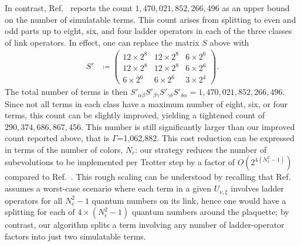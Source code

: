 \documentclass[aps,prd,twocolumn,showpacs,groupedaddress,superscriptaddress,nofootinbib,floatfix,preprintnumbers,longbibliography]{revtex4-1}
\begin{document}
In contrast, Ref.~\cite{Kan:2021xfc} reports the count $1,470,021,852,266,496$ as an upper bound on the number of simulatable terms. This count arises from splitting to even and odd parts up to eight, six, and four ladder operators in each of the three classes of link operators. In effect, one can replace the matrix $S$ above with
%
\begin{align}
    S' & \coloneq 
    \left( \begin{array}{ccc}
        12\times 2^8 & 12\times 2^8 & 6\times 2^6 \\
        12\times 2^8 & 12\times 2^8 & 6\times 2^6 \\
        6\times 2^6 & 6\times 2^6 & 3\times 2^4
    \end{array} \right).
\end{align}
%
The total number of terms is then $S'_{\alpha \beta} S'_{\beta \gamma} S'_{\gamma \delta} S'_{\delta \alpha} =1,470,021,852,266,496$. Since not all terms in each class have a maximum number of eight, six, or four terms, this count can be slightly improved, yielding a tightened count of $290,374,686,867,456$. This number is still significantly larger than our improved count reported above, that is $\Gamma$=1,062,882. This cost reduction can be expressed in terms of the number of colors, $N_c$: our strategy reduces the number of subevolutions to be implemented per Trotter step by a factor of $O(2^{4(N_c^2-1)})$ compared to Ref.~\cite{Kan:2021xfc}. This rough scaling can be understood by recalling that Ref.~\cite{Kan:2021xfc} assumes a worst-case scenario where each term in a given $U_{\nu,\xi}$ involves ladder operators for all $N_c^2-1$ quantum numbers on its link, hence one would have a splitting for each of $4\times(N_c^2-1)$ quantum numbers around the plaquette; by contrast, our algorithm splits a term involving any number of ladder-operator factors into just two simulatable terms.
\end{document}
